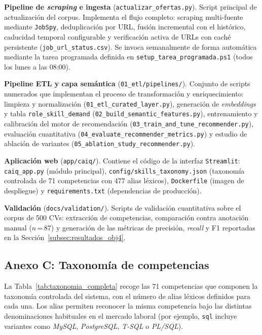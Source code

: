 \textbf{Pipeline de \textit{scraping} e ingesta} (\texttt{actualizar\_ofertas.py}).
Script principal de actualización del corpus. Implementa el flujo completo: scraping
multi-fuente mediante \texttt{JobSpy}, deduplicación por URL, fusión incremental con el
histórico, caducidad temporal configurable y verificación activa de URLs con caché
persistente (\texttt{job\_url\_status.csv}). Se invoca semanalmente de forma automática
mediante la tarea programada definida en \texttt{setup\_tarea\_programada.ps1} (todos
los lunes a las 08:00).

\textbf{Pipeline ETL y capa semántica} (\texttt{01\_etl/pipelines/}). Conjunto de
scripts numerados que implementan el proceso de transformación y enriquecimiento:
limpieza y normalización (\texttt{01\_etl\_curated\_layer.py}), generación de
\textit{embeddings} y tabla \texttt{role\_skill\_demand}
(\texttt{02\_build\_semantic\_features.py}), entrenamiento y calibración del motor de
recomendación (\texttt{03\_train\_and\_tune\_recommender.py}), evaluación cuantitativa
(\texttt{04\_evaluate\_recommender\_metrics.py}) y estudio de ablación de variantes
(\texttt{05\_ablation\_study\_recommender.py}).

\textbf{Aplicación web} (\texttt{app/caiq/}). Contiene el código de la
interfaz \texttt{Streamlit}: \texttt{caiq\_app.py} (módulo principal),
\texttt{config/skills\_taxonomy.json} (taxonomía controlada de 71 competencias con 477
alias léxicos), \texttt{Dockerfile} (imagen de despliegue) y \texttt{requirements.txt}
(dependencias de producción).

\textbf{Validación} (\texttt{docs/validation/}). Scripts de validación cuantitativa sobre
el corpus de 500 CVs: extracción de competencias, comparación contra anotación manual
($n$\,=\,87) y generación de las métricas de precisión, \textit{recall} y F1 reportadas
en la Sección~\ref{subsec:resultados_obj4}.

\subsection*{Anexo C: Taxonomía de competencias}
\label{anexo:taxonomia}

La Tabla~\ref{tab:taxonomia_completa} recoge las 71 competencias que componen la
taxonomía controlada del sistema, con el número de alias léxicos definidos para cada una.
Los alias permiten reconocer la misma competencia bajo las distintas denominaciones
habituales en el mercado laboral (por ejemplo, \texttt{sql} incluye variantes como
\textit{MySQL}, \textit{PostgreSQL}, \textit{T-SQL} o \textit{PL/SQL}).


